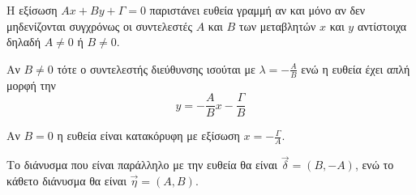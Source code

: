 \documentclass[twoside,nofonts,internet,shmeiwseis]{thewria}
\begin{document}
\thewrhmata
{}
Η εξίσωση $ Ax+By+\varGamma=0 $ παριστάνει ευθεία γραμμή αν και μόνο αν δεν μηδενίζονται συγχρόνως οι συντελεστές $ A $ και $ B $ των μεταβλητών $ x $ και $ y $ αντίστοιχα δηλαδή $ A\neq0 $ ή $ B\neq0 $.
\begin{rlist}
\item Αν $ B\neq0 $ τότε ο συντελεστής διεύθυνσης ισούται με $ \lambda=-\frac{A}{B} $ ενώ η ευθεία έχει απλή μορφή την \[ y=-\frac{A}{B}x-\frac{\varGamma}{B} \]
\item Αν $ B=0 $ η ευθεία είναι κατακόρυφη με εξίσωση $ x=-\frac{\varGamma}{A} $.
\item Το διάνυσμα που είναι παράλληλο με την ευθεία θα είναι $ \vec{\delta}=(B,-A) $, ενώ το κάθετο διάνυσμα θα είναι $ \vec{\eta}=(A,B) $.
\end{rlist}
\end{document}

